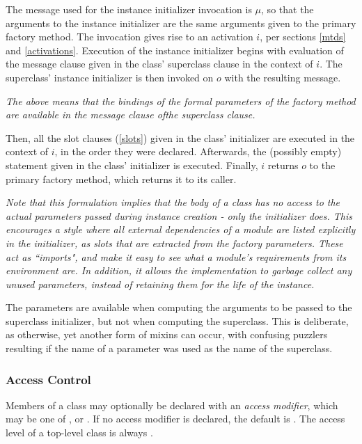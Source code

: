 \documentclass{article}
\begin{document}
The message used for the instance initializer invocation is $\mu$, so that the arguments to the instance initializer are the same arguments given to the primary factory method.  The invocation gives rise to an activation $i$, per sections \ref{mtds} and \ref{activations}.
Execution of the instance initializer begins with evaluation of the message clause given in the class' superclass clause in the context of $i$. The superclass' instance initializer is then invoked on $o$ with the resulting message.

{\it
The above means that the bindings of the formal parameters of the factory method are available in the message clause ofthe superclass clause.
}

Then, all the slot clauses (\ref{slots}) given in the class' initializer are executed in the context of $i$, in the order they were declared. Afterwards, the (possibly empty) statement given in the class' initializer is executed.
Finally, $i$ returns $o$ to the primary factory method, which returns it to its caller.
 
{\it Note that this formulation implies that the body of a class has no access to the actual parameters passed during instance creation - only the initializer does. This encourages a style where all external dependencies of a module are listed explicitly in the initializer, as slots that are extracted from the factory parameters. These act as ``imports", and make it easy to see what a module's requirements from its environment are. In addition, it allows the implementation to garbage collect any unused parameters, instead of retaining them for the life of the instance.

The parameters are available when computing the arguments to be passed to the superclass initializer, but not when computing the superclass. This is deliberate, as otherwise, yet another form of mixins can occur,
 with confusing puzzlers resulting if the name of a parameter was used as the name
 of the superclass.}

 

\subsubsection{Access Control}

Members of a class may optionally be declared with an {\em access modifier}, which may be one of \PUBLIC, \PROTECTED{} or \PRIVATE.  If no access modifier is declared, the default is \PROTECTED{}. The access level of a top-level class is always \PUBLIC{}.
\end{document}
